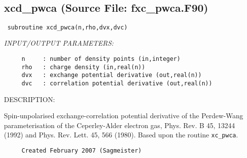\documentclass[11pt]{article}
\begin{document}







 
 
\mbox{}\hrulefill\ 
 
\subsection{xcd\_pwca (Source File: fxc\_pwca.F90)}


\begin{verbatim} subroutine xcd_pwca(n,rho,dvx,dvc)\end{verbatim}{\em INPUT/OUTPUT PARAMETERS:}
\begin{verbatim}     n     : number of density points (in,integer)
     rho   : charge density (in,real(n))
     dvx   : exchange potential derivative (out,real(n))
     dvc   : correlation potential derivative (out,real(n))\end{verbatim}
{\sf DESCRIPTION:\\ }


     Spin-unpolarised exchange-correlation potential derivative of the 
     Perdew-Wang
     parameterisation of the Ceperley-Alder electron gas,
     Phys. Rev. B 45, 13244
     (1992) and Phys. Rev. Lett. 45, 566 (1980). Based upon the routine
     {\tt xc\_pwca}.
  
\begin{verbatim}     Created February 2007 (Sagmeister)\end{verbatim}








 
 
\end{document}

